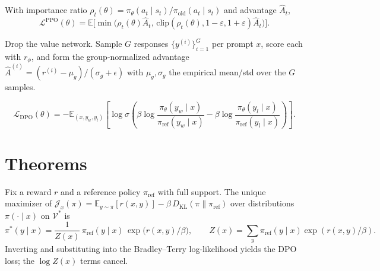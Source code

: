 \begin{definition}
With importance ratio $\rho_t(\theta)=\pi_\theta(a_t\mid s_t)/\pi_{\mathrm{old}}(a_t\mid s_t)$ and advantage $\hat A_t$,
\[
\mathcal{L}^{\mathrm{PPO}}(\theta) = \mathbb{E}\!\Big[\min\!\big(\rho_t(\theta)\hat A_t,\,\mathrm{clip}(\rho_t(\theta),1-\varepsilon,1+\varepsilon)\hat A_t\big)\Big].
\]
\end{definition}

\begin{definition}
Drop the value network. Sample $G$ responses $\{y^{(i)}\}_{i=1}^G$ per prompt $x$, score each with $r_\phi$, and form the group-normalized advantage $\hat A^{(i)} = (r^{(i)}-\mu_g)/(\sigma_g+\epsilon)$ with $\mu_g,\sigma_g$ the empirical mean/std over the $G$ samples.
\end{definition}

\begin{definition}
\[
\mathcal{L}_{\mathrm{DPO}}(\theta) = -\mathbb{E}_{(x,y_w,y_l)}\!\left[\log\sigma\!\left(\beta\log\frac{\pi_\theta(y_w\mid x)}{\pi_{\mathrm{ref}}(y_w\mid x)} - \beta\log\frac{\pi_\theta(y_l\mid x)}{\pi_{\mathrm{ref}}(y_l\mid x)}\right)\right].
\]
\end{definition}

\section*{Theorems}

\begin{theorem}
Fix a reward $r$ and a reference policy $\pi_{\mathrm{ref}}$ with full support. The unique maximizer of
$\mathcal{J}_x(\pi)=\mathbb{E}_{y\sim\pi}[r(x,y)]-\beta\,D_{\mathrm{KL}}(\pi\|\pi_{\mathrm{ref}})$
over distributions $\pi(\cdot\mid x)$ on $\mathcal{V}^*$ is
\[
\pi^*(y\mid x) = \frac{1}{Z(x)}\,\pi_{\mathrm{ref}}(y\mid x)\,\exp\!\big(r(x,y)/\beta\big),\qquad Z(x)=\sum_y\pi_{\mathrm{ref}}(y\mid x)\exp(r(x,y)/\beta).
\]
Inverting and substituting into the Bradley--Terry log-likelihood yields the DPO loss; the $\log Z(x)$ terms cancel.
\end{theorem}


